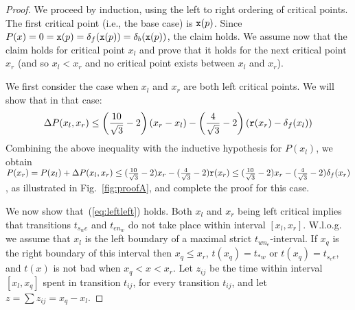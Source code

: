 \begin{proof}
We proceed by induction, using  the left to right ordering of critical points.
The first critical point (i.e., the base case) is ${\tt x}(p)$. Since
$P(x) = 0 = {\tt x}(p) = \delta_f({\tt x}(p)) = \delta_b({\tt x}(p))$,
the claim holds. We assume now that the claim holds
for critical point $x_l$ and prove that it holds for the next critical point
$x_r$ (and so $x_l < x_r$ and no critical point exists between $x_l$ and $x_r$).

 We first consider the case when $x_l$ and $x_r$ are both left critical points. We will show that in that case:
%	
\begin{align}
\label{eq:leftleft}
\Delta P(x_l,x_r) \leq \left(\frac{10}{\sqrt{3}}-2\right)(x_r - x_l) - \left(\frac{4}{\sqrt{3}}-2\right)
({\tt r}(x_r) - \delta_f(x_l))
\end{align}
Combining the above inequality with the inductive hypothesis for $P(x_l)$,
we obtain $P(x_r) = P(x_l) + \Delta P(x_l,x_r) \leq (\frac{10}{\sqrt{3}}-2)x_r
- (\frac{4}{\sqrt{3}}-2){\tt r}(x_r) \leq (\frac{10}{\sqrt{3}}-2)x_r
- (\frac{4}{\sqrt{3}}-2)\delta_f(x_r)$, as illustrated in Fig.~\ref{fig:proofA},
and complete the proof for this case.

We now show that~(\ref{eq:leftleft}) holds. 	
Both $x_l$ and $x_r$ being left critical implies that transitions $t_{s_we}$ and $t_{en_w}$ do not take place
within interval $[x_l, x_r]$. W.l.o.g. we assume that $x_l$ is the left
boundary of a maximal strict $t_{wn_e}$-interval. If $x_q$ is the right boundary
of this interval then $x_q \leq x_r$, $t(x_q) = t_{\ast w}$ or $t(x_q) = t_{s_ee}$,
and $t(x)$ is not bad when $x_q < x < x_r$. Let $z_{ij}$ be the time within
interval $[x_l,x_q]$ spent in transition $t_{ij}$, for every transition $t_{ij}$,
and let $z = \sum z_{ij} = x_q-x_l$.


\end{proof}
